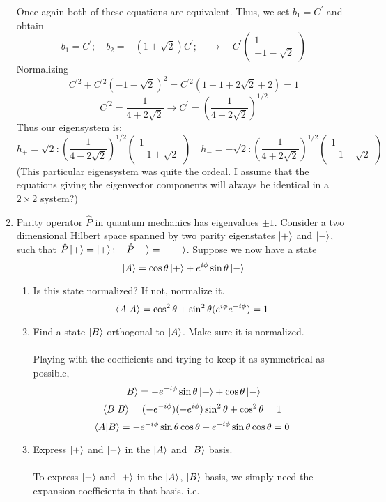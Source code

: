 \documentclass[11pt,letterpaper]{article}
\begin{document}
\begin{enumerate}
Once again both of these equations are equivalent. Thus, we set $b_1 = C^\prime$ and obtain
$$b_1 = C^\prime; \quad b_2 = -(1+\sqrt2)C^\prime;\quad \rightarrow\quad C^\prime\begin{pmatrix}1\\-1-\sqrt2\end{pmatrix}$$
Normalizing
$$C^{\prime2} + C^{\prime2}(-1-\sqrt2)^2 = C^{\prime2}(1+1+2\sqrt2 +2)=1$$
$$C^{\prime2} = \frac{1}{4+2\sqrt2}\rightarrow C^{\prime}=\left(\frac{1}{4+2\sqrt2}\right)^{1/2}$$
Thus our eigensystem is:
$$h_+ = \sqrt2:\left(\frac{1}{4-2\sqrt2}\right)^{1/2}\begin{pmatrix}1\\-1+\sqrt2\end{pmatrix}\quad h_-=-\sqrt2:\left(\frac{1}{4+2\sqrt2}\right)^{1/2}\begin{pmatrix}1\\-1-\sqrt2\end{pmatrix}$$
(This particular eigensystem was quite the ordeal. I assume that the equations giving the eigenvector components will always be identical in a $2\times2$ system?)
\item Parity operator $\hat P$ in quantum mechanics has eigenvalues $\pm 1$. Consider a two dimensional Hilbert space spanned by two parity eigenstates $\ket +$ and $\ket -$, such that $\hat P\ket + = \ket +;\quad \hat P \ket - = -\ket -$. Suppose we now have a state
$$\ket A = \cos\theta\ket + + e^{i\phi}\sin\theta\ket -$$
\begin{enumerate}
\item Is this state normalized? If not, normalize it.
\\ $$\braket{A|A} = \cos^2{\theta}+\sin^2\theta(e^{i\phi}e^{-i\phi})=1$$
\item Find a state $\ket B$ orthogonal to $\ket A$. Make sure it is normalized.
\\ \\Playing with the coefficients and trying to keep it as symmetrical as possible, 
$$\ket B = -e^{-i\phi}\sin\theta\ket + + \cos\theta\ket -$$
$$\braket{B|B} = (-e^{-i\phi})(-e^{i\phi})\sin^2\theta + \cos^2\theta = 1$$
$$\braket{A|B} = -e^{-i\phi}\sin\theta\cos\theta+e^{-i\phi}\sin\theta\cos\theta=0$$
\item Express $\ket +$ and $\ket -$ in the $\ket A$ and $\ket B$ basis.
\\ \\To express $\ket -$ and $\ket +$ in the $\ket A$, $\ket B$ basis, we simply need the expansion coefficients in that basis. i.e.

\end{enumerate}
\end{enumerate}
\end{document}
